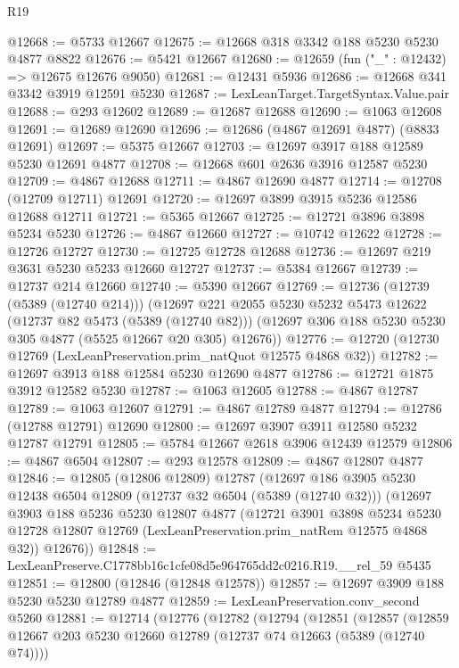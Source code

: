 \begin{lexlean}{R19}
\begin{coremodule}
@12668 := @5733 @12667
@12675 := @12668 @318 @3342 @188 @5230 @5230 @4877 @8822
@12676 := @5421 @12667
@12680 := @12659 (fun ("_" : @12432) => @12675 @12676 @9050)
@12681 := @12431 @5936
@12686 := @12668 @341 @3342 @3919 @12591 @5230
@12687 := LexLeanTarget.TargetSyntax.Value.pair
@12688 := @293 @12602
@12689 := @12687 @12688
@12690 := @1063 @12608
@12691 := @12689 @12690
@12696 := @12686 (@4867 @12691 @4877) (@8833 @12691)
@12697 := @5375 @12667
@12703 := @12697 @3917 @188 @12589 @5230 @12691 @4877
@12708 := @12668 @601 @2636 @3916 @12587 @5230
@12709 := @4867 @12688
@12711 := @4867 @12690 @4877
@12714 := @12708 (@12709 @12711) @12691
@12720 := @12697 @3899 @3915 @5236 @12586 @12688 @12711
@12721 := @5365 @12667
@12725 := @12721 @3896 @3898 @5234 @5230
@12726 := @4867 @12660
@12727 := @10742 @12622
@12728 := @12726 @12727
@12730 := @12725 @12728 @12688
@12736 := @12697 @219 @3631 @5230 @5233 @12660 @12727
@12737 := @5384 @12667
@12739 := @12737 @214 @12660
@12740 := @5390 @12667
@12769 := @12736
    (@12739 (@5389 (@12740 @214)))
    (@12697
      @221
      @2055
      @5230
      @5232
      @5473
      @12622
      (@12737 @82 @5473 (@5389 (@12740 @82)))
      (@12697 @306 @188 @5230 @5230 @305 @4877 (@5525 @12667 @20 @305) @12676))
@12776 := @12720 (@12730 @12769 (LexLeanPreservation.prim_natQuot @12575 @4868 @32))
@12782 := @12697 @3913 @188 @12584 @5230 @12690 @4877
@12786 := @12721 @1875 @3912 @12582 @5230
@12787 := @1063 @12605
@12788 := @4867 @12787
@12789 := @1063 @12607
@12791 := @4867 @12789 @4877
@12794 := @12786 (@12788 @12791) @12690
@12800 := @12697 @3907 @3911 @12580 @5232 @12787 @12791
@12805 := @5784 @12667 @2618 @3906 @12439 @12579
@12806 := @4867 @6504
@12807 := @293 @12578
@12809 := @4867 @12807 @4877
@12846 := @12805
    (@12806 @12809)
    @12787
    (@12697
      @186
      @3905
      @5230
      @12438
      @6504
      @12809
      (@12737 @32 @6504 (@5389 (@12740 @32)))
      (@12697
        @3903
        @188
        @5236
        @5230
        @12807
        @4877
        (@12721
          @3901
          @3898
          @5234
          @5230
          @12728
          @12807
          @12769
          (LexLeanPreservation.prim_natRem @12575 @4868 @32))
        @12676))
@12848 := LexLeanPreserve.C1778bb16c1cfe08d5e964765dd2c0216.R19.__rel_59 @5435
@12851 := @12800 (@12846 (@12848 @12578))
@12857 := @12697 @3909 @188 @5230 @5230 @12789 @4877
@12859 := LexLeanPreservation.conv_second @5260
@12881 := @12714
    (@12776
      (@12782
        (@12794
          (@12851
            (@12857
              (@12859 @12667 @203 @5230 @12660 @12789 (@12737 @74 @12663 (@5389 (@12740 @74))))

\end{coremodule}
\end{lexlean}
